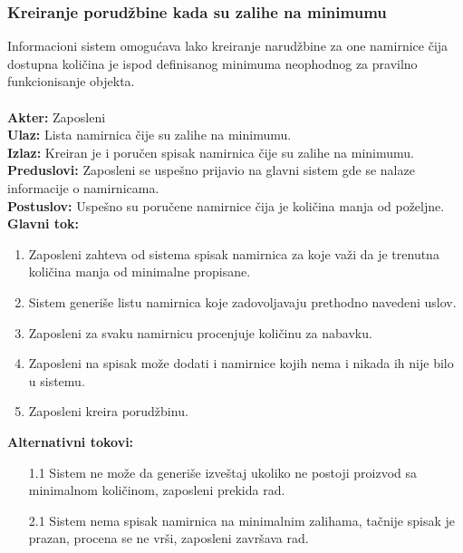 \documentclass{article}
\begin{document}
\subsubsection{Kreiranje porudžbine kada su zalihe na minimumu}
Informacioni sistem omogućava lako kreiranje narudžbine za one namirnice čija dostupna količina je ispod definisanog minimuma neophodnog za pravilno funkcionisanje objekta.\\\\
\textbf{Akter:} Zaposleni\\
\textbf{Ulaz:} Lista namirnica čije su zalihe na minimumu.\\
\textbf{Izlaz:} Kreiran je i poručen spisak namirnica čije su zalihe na minimumu.\\
\textbf{Preduslovi:} Zaposleni se uspešno prijavio na glavni sistem gde se nalaze informacije o namirnicama.\\
\textbf{Postuslov:} Uspešno su poručene namirnice čija je količina manja od poželjne.\\
\textbf{Glavni tok:} 
\begin{enumerate}
	\item Zaposleni zahteva od sistema spisak namirnica za koje važi da je trenutna količina manja od minimalne propisane.
	\item Sistem generiše listu namirnica koje zadovoljavaju prethodno navedeni uslov.
	\item Zaposleni za svaku namirnicu procenjuje količinu za nabavku. 
	\item Zaposleni na spisak može dodati i namirnice kojih nema i nikada ih nije bilo u sistemu. 
	\item Zaposleni kreira porudžbinu.
\end{enumerate}
\textbf{Alternativni tokovi:} \\
\begin{itemize}
\item[1.1] Sistem ne može da generiše izveštaj ukoliko ne postoji proizvod sa minimalnom količinom, zaposleni prekida rad.
\item[2.1] Sistem nema spisak namirnica na minimalnim zalihama, tačnije spisak je prazan, procena se ne vrši, zaposleni završava rad.
\end{itemize}
\end{document}
